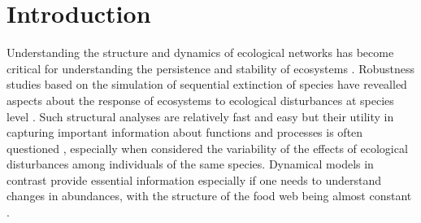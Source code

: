\section*{Introduction}

Understanding the structure and dynamics of ecological networks has become critical for understanding the persistence and stability of ecosystems \cite{dunne2005modeling}. Robustness studies based on the simulation of sequential extinction of species have revealled aspects about the response of ecosystems to ecological disturbances at species level \cite{desantana2013topological}. Such structural analyses are relatively fast and easy but their utility in capturing important information about functions and processes is often questioned \cite{jordan2012simulating}, especially when considered the variability of the effects of ecological disturbances among individuals of the same species. Dynamical models in contrast provide essential information especially if one needs to understand changes in abundances, with the structure of the food web being almost constant \cite{jordan2012simulating}.

